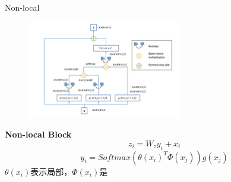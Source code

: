 \begin{frame}{Non-local}
    \begin{multicols}{2}
        \begin{figure}
            \centering
            \includegraphics[width=0.6\textwidth]{docs/paperReading/Non-local/non-local.jpg}
        \end{figure}
        

        \textbf{Non-local Block}
        \begin{equation}
            z_i=W_z y_i+x_i
        \end{equation}
        \hspace*{\fill}
        \hspace*{\fill}
        \hspace*{\fill}
        \begin{equation}
            y_i=Softmax(\theta(x_i)^T \Phi(x_j))g(x_j)
        \end{equation}
        $\theta(x_i)$表示局部，$\Phi(x_i)$是

    \end{multicols}
\end{frame}


